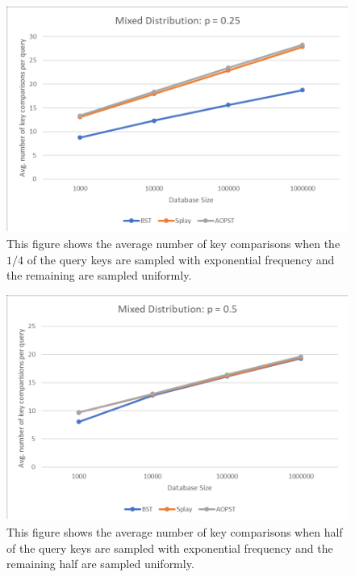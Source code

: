 \documentclass{article}
\newcommand{\figwid}{0.9\linewidth}
\begin{document}
\begin{figure}[H]
\begin{center}
\includegraphics[width=\figwid,keepaspectratio]{p-25.pdf}
\caption{\footnotesize This figure shows the average number of key comparisons when the $1/4$ of the query keys are sampled with exponential frequency and the remaining are sampled uniformly.}
\label{fig:p-25}
\end{center}
\end{figure}

\begin{figure}[H]
\begin{center}
\includegraphics[width=\figwid,keepaspectratio]{p-5.pdf}
\caption{\footnotesize This figure shows the average number of key comparisons when half of the query keys are sampled with exponential frequency and the remaining half are sampled uniformly.}
\label{fig:p-5}
\end{center}
\end{figure}
\end{document}
